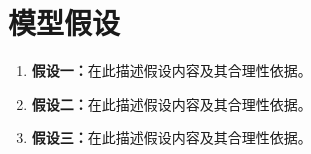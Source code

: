 \section{模型假设}


\begin{enumerate}[label=\arabic*.,leftmargin=*]
  \item \textbf{假设一：}在此描述假设内容及其合理性依据。
  \item \textbf{假设二：}在此描述假设内容及其合理性依据。
  \item \textbf{假设三：}在此描述假设内容及其合理性依据。
\end{enumerate}
